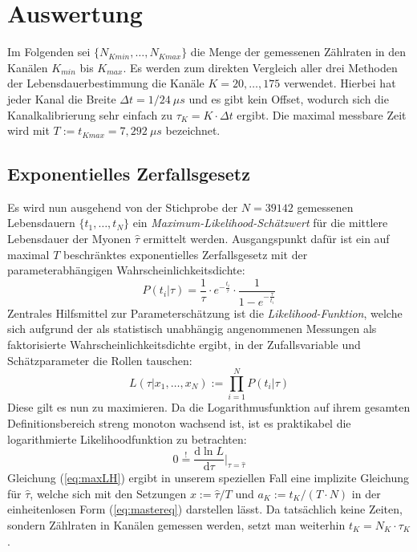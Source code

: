 \section{Auswertung}
	Im Folgenden sei $\{N_{Kmin},\dots,N_{Kmax}\}$ die Menge der gemessenen Zählraten in den Kanälen $K_{min}$ bis $ K_{max}$. Es werden zum direkten Vergleich aller drei Methoden der Lebensdauerbestimmung die Kanäle $K = 20, \dots ,175$ verwendet. Hierbei hat jeder Kanal die Breite $\Delta t = 1/24\ \unit{\mu s}$ und es gibt kein Offset, wodurch sich die Kanalkalibrierung sehr einfach zu $\tau_K = K\cdot \Delta t$ ergibt. Die maximal messbare Zeit wird mit $T := t_{Kmax} = 7,292\ \unit{\mu s}$ bezeichnet. 
	\subsection{Exponentielles Zerfallsgesetz}
	Es wird nun ausgehend von der Stichprobe der $N = 39142$ gemessenen Lebensdauern $\{t_1,\dots,t_N\}$ ein \textit{Maximum-Likelihood-Schätzwert} für die mittlere Lebensdauer der Myonen $\hat{\tau}$ ermittelt werden. Ausgangspunkt dafür ist ein auf maximal $T$ beschränktes exponentielles Zerfallsgesetz mit der parameterabhängigen Wahrscheinlichkeitsdichte:
		\begin{equation}
			P(t_i|\tau) = \frac{1}{\tau}\cdot e^{-\frac{t_i}{\tau}} \cdot\frac{1}{1-e^{-\frac{\tau}{t_i}}}
		\end{equation}
	Zentrales Hilfsmittel zur Parameterschätzung ist die \textit{Likelihood-Funktion}, welche sich aufgrund der als statistisch unabhängig angenommenen Messungen als faktorisierte Wahrscheinlichkeitsdichte ergibt, in der Zufallsvariable und Schätzparameter die Rollen tauschen:
		\begin{equation}
			L(\tau|x_1,\dots,x_N) := \prod_{i = 1}^{N} P(t_i|\tau) 
		\end{equation}
	Diese gilt es nun zu maximieren. Da die Logarithmusfunktion auf ihrem gesamten Definitionsbereich streng monoton wachsend ist, ist es praktikabel die logarithmierte Likelihoodfunktion zu betrachten:
		\begin{equation} \label{eq:maxLH}
			0 \overset{!}{=} \frac{\mathrm{d}\ln L}{\mathrm{d} \tau}\bigg|_{\tau = \hat{\tau}}  
		\end{equation}
	Gleichung (\ref{eq:maxLH}) ergibt in unserem speziellen Fall eine implizite Gleichung für $\hat{\tau}$, welche sich mit den Setzungen $x := \hat{\tau}/T$ und $a_K := t_K/(T\cdot N)$ in der einheitenlosen Form (\ref{eq:mastereq}) darstellen lässt. Da tatsächlich keine Zeiten, sondern Zählraten in Kanälen gemessen werden, setzt man weiterhin $t_K = N_K \cdot \tau_K$.
